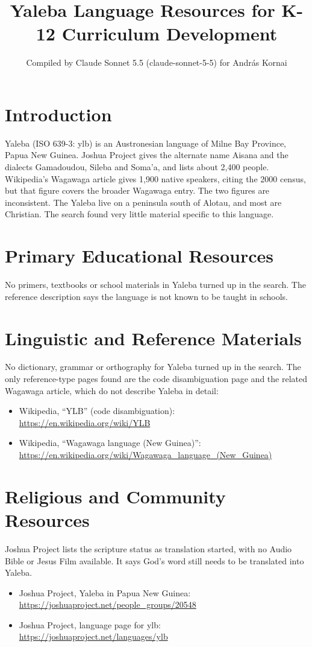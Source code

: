 \documentclass[12pt]{article}
\title{Yaleba Language Resources for K-12 Curriculum Development}
\author{Compiled by Claude Sonnet 5.5 (claude-sonnet-5-5) for Andr\'as Kornai}
\date{}
\begin{document}
\maketitle

\section{Introduction}
Yaleba (ISO 639-3: ylb) is an Austronesian language of Milne Bay Province, Papua New Guinea. Joshua Project gives the alternate name Aisana and the dialects Gamadoudou, Sileba and Soma'a, and lists about 2,400 people. Wikipedia's Wagawaga article gives 1,900 native speakers, citing the 2000 census, but that figure covers the broader Wagawaga entry. The two figures are inconsistent. The Yaleba live on a peninsula south of Alotau, and most are Christian. The search found very little material specific to this language.

\section{Primary Educational Resources}
No primers, textbooks or school materials in Yaleba turned up in the search. The reference description says the language is not known to be taught in schools.

\section{Linguistic and Reference Materials}
No dictionary, grammar or orthography for Yaleba turned up in the search. The only reference-type pages found are the code disambiguation page and the related Wagawaga article, which do not describe Yaleba in detail:
\begin{itemize}
\item Wikipedia, ``YLB'' (code disambiguation): \url{https://en.wikipedia.org/wiki/YLB}
\item Wikipedia, ``Wagawaga language (New Guinea)'': \url{https://en.wikipedia.org/wiki/Wagawaga_language_(New_Guinea)}
\end{itemize}

\section{Religious and Community Resources}
Joshua Project lists the scripture status as translation started, with no Audio Bible or Jesus Film available. It says God's word still needs to be translated into Yaleba.
\begin{itemize}
\item Joshua Project, Yaleba in Papua New Guinea: \url{https://joshuaproject.net/people_groups/20548}
\item Joshua Project, language page for ylb: \url{https://joshuaproject.net/languages/ylb}
\end{itemize}
\end{document}
